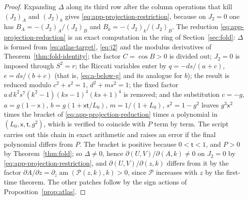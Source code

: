 \documentclass[11pt]{article}
\theoremstyle{remark}
\newcommand{\am}{\operatorname{am}}
\begin{document}
\begin{proof}
Expanding $\Delta$ along its third row after the column operations that
kill $(J_2)_A$ and $(J_2)_k$ gives \eqref{eq:app-projection-restriction},
because on $J_2=0$ one has $B_A=-(J_2)_A/(J_2)_B$ and $B_k=-(J_2)_k/(J_2)_B$.
The reduction \eqref{eq:app-projection-reduction} is an exact computation
in the ring of Section~\ref{sec:fold}: $\Delta$ is formed from
\eqref{eq:atlas-target}, \eqref{eq:j2} and the modulus derivatives of
Theorem~\ref{thm:fold-identity}; the factor $C=\cos B>0$ is divided out;
$J_2=0$ is imposed through $S^2=r$; the Riccati variables enter by
$q=-ds/(a+c)$, $e=ds/(b+c)$ (that is, \eqref{eq:a-below-g} and its
analogue for $b$); the result is reduced modulo $c^2+s^2=1$,
$d^2+ms^2=1$; the fixed factor $a\,d\,k^2s^7(k^2-1)(ks-1)^4(ks+1)^4$ is
removed; and the substitution $c=-g$, $a=g(1-\mathsf x)$,
$b=g(1+\mathsf x\mathsf t/L_0)$, $m=1/(1+L_0)$, $s^2=1-g^2$ leaves
$g^3\mathsf x^2$ times the bracket of \eqref{eq:app-projection-reduction}
times a polynomial in $(L_0,\mathsf x,\mathsf t,g^2)$, which is verified to
coincide with $P$ term by term.  The script
 carries out this
chain in exact arithmetic and raises an error if the final polynomial
differs from $P$.  The bracket is positive because $0<\mathsf t<1$, and
$P>0$ by Theorem~\ref{thm:fold}; so $\Delta\ne0$, hence
$\partial(U,V)/\partial(A,k)\ne0$ on $J_2=0$ by
\eqref{eq:app-projection-restriction}, and $\partial(U,V)/\partial(z,k)$
differs from it by the factor $\partial A/\partial z=\partial_z\am(\mathcal P(z,k),k)>0$,
since $\mathcal P$ increases with $z$ by the first-time theorem.  The other
patches follow by the sign actions of Proposition~\ref{prop:atlas}.
\end{proof}
\end{document}
